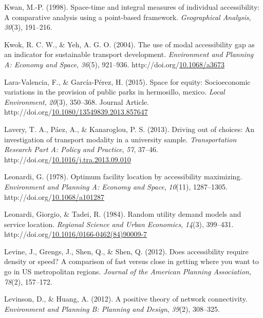 \documentclass[
11pt, %
oneside, %
english, %
singlespacing, %
]{macthesis} %
\newlength{\cslhangindent}
\newenvironment{CSLReferences}[2] %
{\begin{list}{}{%
	\setlength{\itemindent}{0pt}
	\setlength{\leftmargin}{0pt}
	\setlength{\parsep}{0pt}
	\ifodd #1
	\setlength{\leftmargin}{\cslhangindent}
	\setlength{\itemindent}{-1\cslhangindent}
	\fi
	\setlength{\itemsep}{#2\baselineskip}}}
{\end{list}}
\begin{document}
\begin{CSLReferences}{1}{0}
Kwan, M.-P. (1998). Space-time and integral measures of individual accessibility: A comparative analysis using a point-based framework. \emph{Geographical Analysis}, \emph{30}(3), 191--216.

Kwok, R. C. W., \& Yeh, A. G. O. (2004). The use of modal accessibility gap as an indicator for sustainable transport development. \emph{Environment and Planning A: Economy and Space}, \emph{36}(5), 921--936. http://doi.org/\href{https://doi.org/10.1068/a3673}{10.1068/a3673}

Lara-Valencia, F., \& García-Pérez, H. (2015). Space for equity: Socioeconomic variations in the provision of public parks in hermosillo, mexico. \emph{Local Environment}, \emph{20}(3), 350--368. Journal Article. http://doi.org/\href{https://doi.org/10.1080/13549839.2013.857647}{10.1080/13549839.2013.857647}

Lavery, T. A., Páez, A., \& Kanaroglou, P. S. (2013). Driving out of choices: {An} investigation of transport modality in a university sample. \emph{Transportation Research Part A: Policy and Practice}, \emph{57}, 37--46. http://doi.org/\href{https://doi.org/10.1016/j.tra.2013.09.010}{10.1016/j.tra.2013.09.010}

Leonardi, G. (1978). Optimum facility location by accessibility maximizing. \emph{Environment and Planning A: Economy and Space}, \emph{10}(11), 1287--1305. http://doi.org/\href{https://doi.org/10.1068/a101287}{10.1068/a101287}

Leonardi, Giorgio, \& Tadei, R. (1984). Random utility demand models and service location. \emph{Regional Science and Urban Economics}, \emph{14}(3), 399--431. http://doi.org/\href{https://doi.org/10.1016/0166-0462(84)90009-7}{10.1016/0166-0462(84)90009-7}

Levine, J., Grengs, J., Shen, Q., \& Shen, Q. (2012). Does accessibility require density or speed? A comparison of fast versus close in getting where you want to go in US metropolitan regions. \emph{Journal of the American Planning Association}, \emph{78}(2), 157--172.

Levinson, D., \& Huang, A. (2012). A positive theory of network connectivity. \emph{Environment and Planning B: Planning and Design}, \emph{39}(2), 308--325.


\end{CSLReferences}
\end{document}
